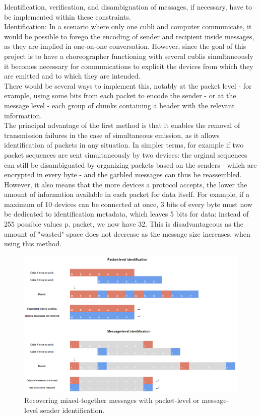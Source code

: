 Identification, verification, and disambiguation of messages, if necessary, have to be implemented within these constraints.\\

Identification: In a scenario where only one cubli and computer communicate, it would be possible to forego the encoding of sender and recipient inside messages, as they are implied in one-on-one conversation. However, since the goal of this project is to have a choreographer functioning with several cublis simultaneously it becomes necessary for communications to explicit the devices from which they are emitted and to which they are intended.\\

There would be several ways to implement this, notably at the packet level - for example, using some bits from each packet to encode the sender - or at the message level - each group of chunks containing a header with the relevant information.\\

The principal advantage of the first method is that it enables the removal of transmission failures in the case of simultaneous emission, as it allows identification of packets in any situation. In simpler terms, for example if two packet sequences are sent simultaneously by two devices: the orginal sequences can still be disambiguated by organizing packets based on the senders - which are encrypted in every byte - and the garbled messages can thus be reassembled.\\

However, it also means that the more devices a protocol accepts, the lower the amount of information available in each packet for data itself. For example, if a maximum of 10 devices can be connected at once, 3 bits of every byte must now be dedicated to identification metadata, which leaves 5 bits for data: instead of 255 possible values p. packet, we now have 32. This is disadvantageous as the amount of "wasted" space does not decrease as the message size increases, when using this method.\\

\begin{figure}[ht]
   \centering
   \includegraphics[width=1\textwidth]{img/disambiguation.png}
   \caption{Recovering mixed-together messages with packet-level or message-level sender identification.}
   \label{img:disambiguation}
\end{figure}

